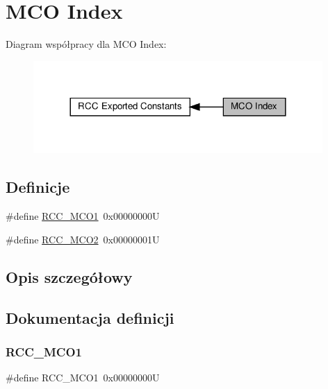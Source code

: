 \hypertarget{group___r_c_c___m_c_o___index}{}\section{M\+CO Index}
\label{group___r_c_c___m_c_o___index}
Diagram współpracy dla M\+CO Index\+:\nopagebreak
\begin{figure}[H]
\begin{center}
\leavevmode
\includegraphics[width=312pt]{group___r_c_c___m_c_o___index}
\end{center}
\end{figure}
\subsection*{Definicje}
\begin{DoxyCompactItemize}
\item 
\#define \hyperlink{group___r_c_c___m_c_o___index_ga152dd1ae9455e528526c4e23a817937b}{R\+C\+C\+\_\+\+M\+C\+O1}~0x00000000U
\item 
\#define \hyperlink{group___r_c_c___m_c_o___index_ga248f59fc2868f83bea4f2d182edcdf4c}{R\+C\+C\+\_\+\+M\+C\+O2}~0x00000001U
\end{DoxyCompactItemize}


\subsection{Opis szczegółowy}


\subsection{Dokumentacja definicji}
\mbox{\label{group___r_c_c___m_c_o___index_ga152dd1ae9455e528526c4e23a817937b}} 
\subsubsection{\texorpdfstring{R\+C\+C\+\_\+\+M\+C\+O1}{RCC\_MCO1}}
{\footnotesize\ttfamily \#define R\+C\+C\+\_\+\+M\+C\+O1~0x00000000U}



